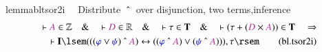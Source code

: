 \begin{restatable}{lemma}{bltsor2i}~~ Distribute $~\string^~$ over disjunction,
two terms,inference
\begin{align}
\vdash \mc{A} \in \mathbb{Z}\quad\&\quad \vdash \mc{D} \in
    \mathbb{R}\quad\&\quad \vdash \tau \in \mathbf{T}\quad\&\quad \vdash ( \tau
    + ( \mc{D} \times \mc{A} ) ) \in \mathbf{T}\quad\Rightarrow \notag \\ %
     \quad \vdash
    \mathbf{I} \lsem ( ( ( \mw{\varphi} \vee \mw{\psi} ) ~\string^~ \mc{A} )
    \leftrightarrow ( ( \mw{\varphi} ~\string^~ \mc{A} ) \vee ( \mw{\psi}
    ~\string^~ \mc{A} ) ) ) , \tau \rsem\label{eq:bl.tsor2i}\tag{bl.tsor2i}
\end{align}
\end{restatable}

